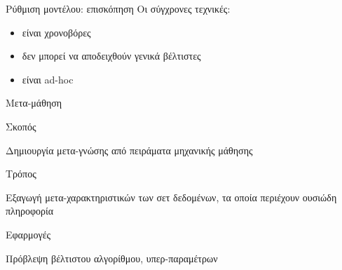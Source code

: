 \documentclass{beamer}
\begin{document}
    \begin{frame} {Ρύθμιση μοντέλου: επισκόπηση}
    Οι σύγχρονες τεχνικές:
    \begin{itemize}
    	\item είναι χρονοβόρες
    	\item δεν μπορεί να αποδειχθούν γενικά βέλτιστες
    	\item είναι ad-hoc
    \end{itemize}
    \end{frame}
  \begin{frame}{Μετα-μάθηση}
  	\begin{minipage}[t]{.3\textwidth}  		
  		Σκοπός
  		\vspace{4ex}
  	\end{minipage}%
  	\begin{minipage}[t]{.6\textwidth}
  		Δημιουργία μετα-γνώσης από πειράματα μηχανικής μάθησης  	
  		\vspace{4ex}
  	\end{minipage}
  	\begin{minipage}[t]{.3\textwidth}  		
  		Τρόπος
  		\vspace{4ex}
  	\end{minipage}%
  	\begin{minipage}[t]{.6\textwidth}
  		Εξαγωγή μετα-χαρακτηριστικών των σετ δεδομένων, τα οποία περιέχουν ουσιώδη πληροφορία
  		\vspace{4ex} 
  	\end{minipage}
  	\begin{minipage}[t]{.3\textwidth}  		
  		Εφαρμογές
  		\vspace{4ex}
  	\end{minipage}%
  	\begin{minipage}[t]{.6\textwidth}
  		Πρόβλεψη βέλτιστου αλγορίθμου, υπερ-παραμέτρων 
  		\vspace{4ex}
  	\end{minipage}
  	\end{frame}
\end{document}
